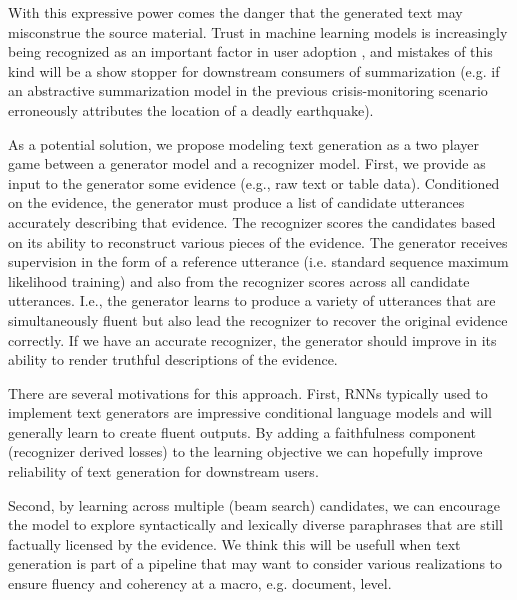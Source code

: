 With this expressive power comes the danger that the generated text may
misconstrue the source material. Trust in machine learning
models is increasingly being recognized as an important factor in user 
adoption \cite{ribeiro2016should}, and mistakes of this kind will be 
a show stopper for downstream consumers of summarization (e.g. if an
abstractive summarization model in the previous crisis-monitoring scenario
erroneously attributes the location of a deadly earthquake). 

%

As a potential solution,
we propose modeling text generation as a two player game between a generator
model and a recognizer model. %
First, we provide as input to the 
generator some evidence (e.g., raw text or table data). 
Conditioned on the evidence, the generator must produce 
a list of candidate utterances accurately describing that evidence. The recognizer
scores the candidates based on its ability to reconstruct various 
pieces of the evidence. The generator receives supervision in the form of a 
reference utterance (i.e. standard sequence maximum likelihood training) 
and also from the recognizer scores across all candidate
utterances.
I.e., the generator learns to produce a variety of utterances that are
simultaneously fluent but also lead the recognizer to recover the original
evidence correctly. If we have an accurate recognizer, the generator should
improve in its ability to render truthful descriptions of the evidence.





There are several motivations for this approach. 
First, RNNs typically used to implement text generators are impressive
conditional language models and will generally learn to create fluent outputs.
By adding a faithfulness component (recognizer derived 
losses) to the learning objective we can hopefully improve reliability 
of text generation for downstream users. 

Second, by learning across
multiple (beam search) candidates, we can encourage the model to 
explore syntactically and lexically diverse paraphrases that are still
factually licensed by the evidence. We think this will be usefull when
text generation is part of a pipeline that may want to consider various 
realizations to ensure fluency and coherency at a macro, e.g. document, level.

